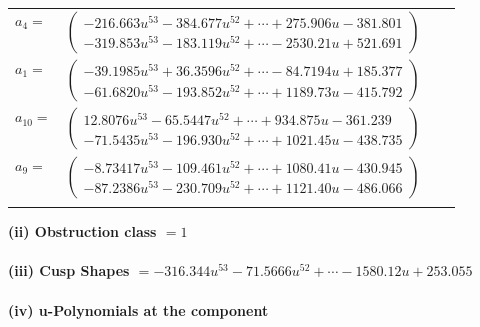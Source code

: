 \documentclass[1p]{elsarticle_modified}
\theoremstyle{definition}
\begin{document}
\begin{tabular}{m{7pt} m{180pt} m{7pt} m{180pt} }
\flushright $a_{4}=$&$\begin{pmatrix}-216.663 u^{53}-384.677 u^{52}+\cdots+275.906 u-381.801\\-319.853 u^{53}-183.119 u^{52}+\cdots-2530.21 u+521.691\end{pmatrix}$ \\
\flushright $a_{1}=$&$\begin{pmatrix}-39.1985 u^{53}+36.3596 u^{52}+\cdots-84.7194 u+185.377\\-61.6820 u^{53}-193.852 u^{52}+\cdots+1189.73 u-415.792\end{pmatrix}$ \\
\flushright $a_{10}=$&$\begin{pmatrix}12.8076 u^{53}-65.5447 u^{52}+\cdots+934.875 u-361.239\\-71.5435 u^{53}-196.930 u^{52}+\cdots+1021.45 u-438.735\end{pmatrix}$ \\
\flushright $a_{9}=$&$\begin{pmatrix}-8.73417 u^{53}-109.461 u^{52}+\cdots+1080.41 u-430.945\\-87.2386 u^{53}-230.709 u^{52}+\cdots+1121.40 u-486.066\end{pmatrix}$\\&\end{tabular}
\flushleft \textbf{(ii) Obstruction class $= 1$}\\~\\
\flushleft \textbf{(iii) Cusp Shapes $= -316.344 u^{53}-71.5666 u^{52}+\cdots-1580.12 u+253.055$}\\~\\
\newpage\renewcommand{\arraystretch}{1}
\flushleft \textbf{(iv) u-Polynomials at the component}\newline \\
\end{document}
